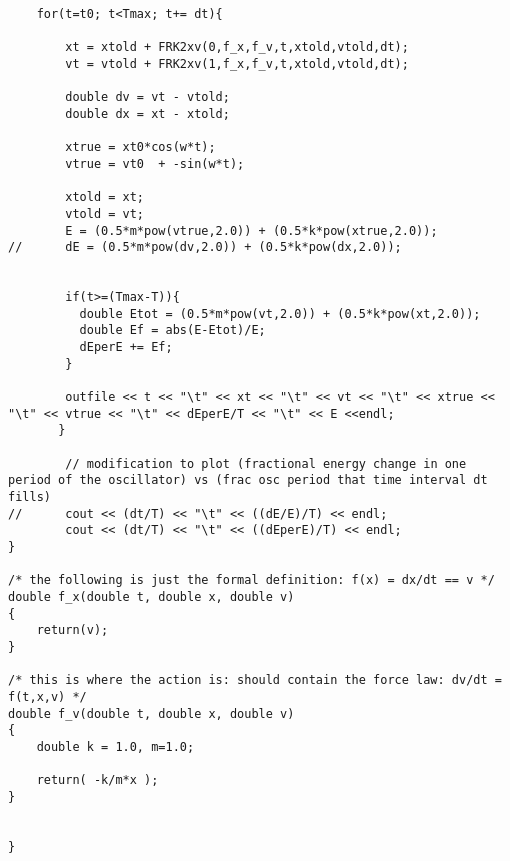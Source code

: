 \documentclass[11pt]{article}
\begin{document}
\begin{lstlisting}
	for(t=t0; t<Tmax; t+= dt){

		xt = xtold + FRK2xv(0,f_x,f_v,t,xtold,vtold,dt);
		vt = vtold + FRK2xv(1,f_x,f_v,t,xtold,vtold,dt);
		
		double dv = vt - vtold;
		double dx = xt - xtold;
		
		xtrue = xt0*cos(w*t);
		vtrue = vt0  + -sin(w*t);

		xtold = xt;
		vtold = vt;
		E = (0.5*m*pow(vtrue,2.0)) + (0.5*k*pow(xtrue,2.0));
//		dE = (0.5*m*pow(dv,2.0)) + (0.5*k*pow(dx,2.0));
		
		
		if(t>=(Tmax-T)){
		  double Etot = (0.5*m*pow(vt,2.0)) + (0.5*k*pow(xt,2.0));
		  double Ef = abs(E-Etot)/E;
		  dEperE += Ef;
		}
		
		outfile << t << "\t" << xt << "\t" << vt << "\t" << xtrue << "\t" << vtrue << "\t" << dEperE/T << "\t" << E <<endl;
	   }

		// modification to plot (fractional energy change in one period of the oscillator) vs (frac osc period that time interval dt fills)
//		cout << (dt/T) << "\t" << ((dE/E)/T) << endl;
		cout << (dt/T) << "\t" << ((dEperE)/T) << endl;
}

/* the following is just the formal definition: f(x) = dx/dt == v */
double f_x(double t, double x, double v)
{
	return(v);
}

/* this is where the action is: should contain the force law: dv/dt = f(t,x,v) */
double f_v(double t, double x, double v)
{
	double k = 1.0, m=1.0;

	return( -k/m*x );
}


}\end{lstlisting}
\end{document}
